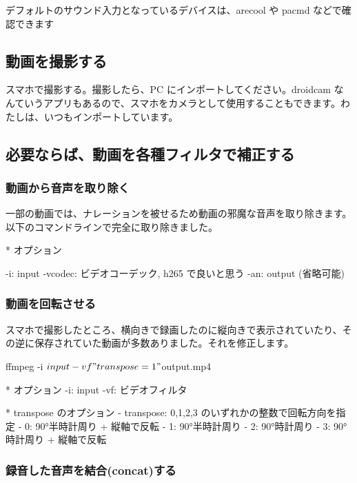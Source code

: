 \documentclass[mingoth,a4paper]{jsarticle}
\begin{document}
デフォルトのサウンド入力となっているデバイスは、arecool や pacmd などで確認できます

\subsection{動画を撮影する}
スマホで撮影する。撮影したら、PC にインポートしてください。droidcam なんていうアプリもあるので、スマホをカメラとして使用することもできます。わたしは、いつもインポートしています。

\subsection{必要ならば、動画を各種フィルタで補正する}

\subsubsection{動画から音声を取り除く}
一部の動画では、ナレーションを被せるため動画の邪魔な音声を取り除きます。以下のコマンドラインで完全に取り除きました。

* オプション
\begin{commandline}
  -i: input
  -vcodec: ビデオコーデック, h265 で良いと思う
  -an: output (省略可能)
\end{commandline}

\subsubsection{ 動画を回転させる}
スマホで撮影したところ、横向きで録画したのに縦向きで表示されていたり、その逆に保存されていた動画が多数ありました。それを修正します。
\begin{commandline}
ffmpeg -i ${input} -vf "transpose=1" ${output}.mp4
\end{commandline}

\begin{commandline}
* オプション
  -i: input
  -vf: ビデオフィルタ

* transpose のオプション
  - transpose: 0,1,2,3 のいずれかの整数で回転方向を指定
	  - 0: 90°半時計周り + 縦軸で反転
	  - 1: 90°半時計周り
	  - 2: 90°時計周り
	  - 3: 90°時計周り + 縦軸で反転
\end{commandline}

\subsubsection{録音した音声を結合(concat)する}
\end{document}
